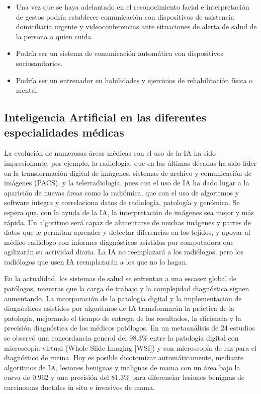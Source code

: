 \documentclass[10pt]{article}
\begin{document}
\begin{enumerate}
\begin{itemize}
    \item Una vez que se haya adelantado en el reconocimiento facial e interpretación de gestos podría establecer comunicación con dispositivos de asistencia domiciliaria urgente y videoconferencias ante situaciones de alerta de salud de la persona a quien cuida.
    \item Podría ser un sistema de comunicación automática con dispositivos sociosanitarios.
    \item Podría ser un entrenador en habilidades y ejercicios de rehabilitación física o mental.
\end{itemize}
    
\end{enumerate}

    \subsection{Inteligencia Artificial en las diferentes especialidades médicas}
    
    La evolución de numerosas áreas médicas con el uso de la IA ha sido impresionante: por ejemplo, la radiología, que en las últimas décadas ha sido líder en la transformación digital de imágenes, sistemas de archivo y comunicación de imágenes (PACS), y la telerradiología, pues con el uso de IA ha dado lugar a la aparición de nuevas áreas como la radiómica, que con el uso de algoritmos y software integra y correlaciona datos de radiología, patología y genómica. Se espera que, con la ayuda de la IA, la interpretación de imágenes sea mejor y más rápida. Un algoritmo será capaz de alimentarse de muchas imágenes y partes de datos que le permitan aprender y detectar diferencias en los tejidos, y apoyar al médico radiólogo con informes diagnósticos asistidos por computadora que agilizarán su actividad diaria. La IA no reemplazará a los radiólogos, pero los radiólogos que usen IA reemplazarán a los que no lo hagan.
    
    
    En la actualidad, los sistemas de salud se enfrentan a una escasez global de patólogos, mientras que la carga de trabajo y la complejidad diagnóstica siguen aumentando. La incorporación de la patología digital y la implementación de diagnósticos asistidos por algoritmos de IA transformarán la práctica de la patología, mejorando el tiempo de entrega de los resultados, la eficiencia y la precisión diagnóstica de los médicos patólogos. En un metaanálisis de 24 estudios se observó una concordancia general del 98.3\% entre la patología digital con microscopía virtual (Whole Slide Imaging [WSI]) y con microscopía de luz para el diagnóstico de rutina. Hoy es posible dicotomizar automáticamente, mediante algoritmos de IA, lesiones benignas y malignas de mama con un área bajo la curva de 0.962 y una precisión del 81.3\% para diferenciar lesiones benignas de carcinomas ductales in situ e invasivos de mama.
    
\end{document}
